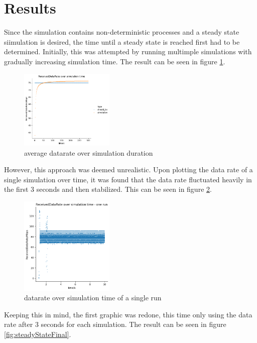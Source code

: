 \section{Results}

Since the simulation contains non-deterministic processes and a steady state siimulation is desired,
the time until a steady state is reached first had to be determined. Initially, this was attempted by running multimple
simulations with gradually increasing simulation time. The result can be seen in figure \ref{fig:steadyStateInitial}.
\begin{figure}[ht]
    \centering
    \includegraphics[width=0.4\textwidth]{../DataAnalysis/results/dr_over_time.png}
    \caption{average datarate over simulation duration}
    \label{fig:steadyStateInitial}
\end{figure}
However, this approach was deemed unrealistic. Upon plotting the data rate of a single simulation over time,
it was found that the data rate fluctuated heavily in the first 3 seconds and then stabilized.
This can be seen in figure \ref{fig:steadyStateInitialSingle}.

\begin{figure}[ht]
    \centering
    \includegraphics[width=0.4\textwidth]{../DataAnalysis/results/dr_over_time_single_run.png}
    \caption{datarate over simulation time of a single run}
    \label{fig:steadyStateInitialSingle}
\end{figure}

Keeping this in mind, the first graphic was redone, this time only using the data rate after 3 seconds for each simulation.
The result can be seen in figure \ref{fig:steadyStateFinal}.

